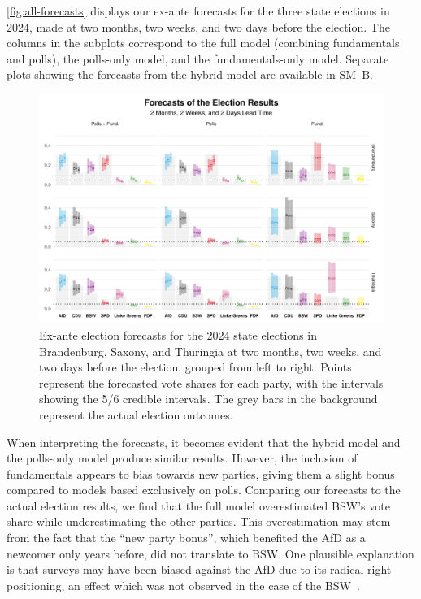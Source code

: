 \documentclass[12pt]{article}
\begin{document}
\begin{doublespacing}
\autoref{fig:all-forecasts} displays our ex-ante forecasts for the three state elections in 2024, made at two months, two weeks, and two days before the election. The columns in the subplots correspond to the full model (combining fundamentals and polls), the polls-only model, and the fundamentals-only model. Separate plots showing the forecasts from the hybrid model are available in SM~B. 

\begin{figure}[!t]
    \centering
    \includegraphics[width=\textwidth]{fg5_all_fcsts.pdf}
    \caption{Ex-ante election forecasts for the 2024 state elections in Brandenburg, Saxony, and Thuringia at two months, two weeks, and two days before the election, grouped from left to right. Points represent the forecasted vote shares for each party, with the intervals showing the 5/6 credible intervals. The grey bars in the background represent the actual election outcomes.}
    \label{fig:all-forecasts}
\end{figure}

When interpreting the forecasts, it becomes evident that the hybrid model and the polls-only model produce similar results. However, the inclusion of fundamentals appears to bias towards new parties, giving them a slight bonus compared to models based exclusively on polls. Comparing our forecasts to the actual election results, we find that the full model overestimated BSW's vote share while underestimating the other parties. This overestimation may stem from the fact that the “new party bonus”, which benefited the AfD as a newcomer only years before, did not translate to BSW. One plausible explanation is that surveys may have been biased against the AfD due to its radical-right positioning, an effect which was not observed in the case of the  BSW~\citep{valentim_right_2021}.


\end{doublespacing}
\end{document}
